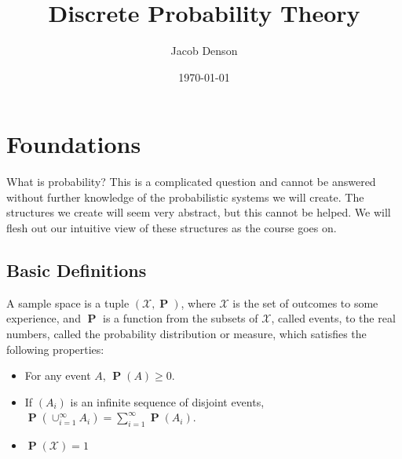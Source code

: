 \documentclass{report}
\title{Discrete Probability Theory}
\author{Jacob Denson}
\date{\today}
\makeatletter
\DeclareMathOperator{\prob}{\mathbf{P}}
\def\printauthor{%
    {\large \@author}}
\newcommand\titlepagedecoration{%
\begin{tikzpicture}[remember picture,overlay,shorten >= -10pt]

\coordinate (aux1) at ([yshift=-15pt]current page.north east);
\coordinate (aux2) at ([yshift=-410pt]current page.north east);
\coordinate (aux3) at ([xshift=-4.5cm]current page.north east);
\coordinate (aux4) at ([yshift=-150pt]current page.north east);

\begin{scope}[titlepagecolor!40,line width=12pt,rounded corners=12pt]
\draw
  (aux1) -- coordinate (a)
  ++(225:5) --
  ++(-45:5.1) coordinate (b);
\draw[shorten <= -10pt]
  (aux3) --
  (a) --
  (aux1);
\draw[opacity=0.6,titlepagecolor,shorten <= -10pt]
  (b) --
  ++(225:2.2) --
  ++(-45:2.2);
\end{scope}
\draw[titlepagecolor,line width=8pt,rounded corners=8pt,shorten <= -10pt]
  (aux4) --
  ++(225:0.8) --
  ++(-45:0.8);
\begin{scope}[titlepagecolor!70,line width=6pt,rounded corners=8pt]
\draw[shorten <= -10pt]
  (aux2) --
  ++(225:3) coordinate[pos=0.45] (c) --
  ++(-45:3.1);
\draw
  (aux2) --
  (c) --
  ++(135:2.5) --
  ++(45:2.5) --
  ++(-45:2.5) coordinate[pos=0.3] (d);   
\draw 
  (d) -- +(45:1);
\end{scope}
\end{tikzpicture}%
}
\makeatother
\begin{document}

\chapter{Foundations}

What is probability? This is a complicated question and cannot be answered without further knowledge of the probabilistic systems we will create. The structures we create will seem very abstract, but this cannot be helped. We will flesh out our intuitive view of these structures as the course goes on.

\section{Basic Definitions}

A sample space is a tuple $(\mathcal{X}, \prob)$, where $\mathcal{X}$ is the set of outcomes to some experience, and $\prob$ is a function from the subsets of $\mathcal{X}$, called events, to the real numbers, called the probability distribution or measure, which satisfies the following properties:
\begin{itemize}
    \item For any event $A$, $\prob(A) \geq 0$.
    \item If $(A_i)$ is an infinite sequence of disjoint events, $\prob(\cup_{i = 1}^\infty A_i) = \sum_{i = 1}^\infty \prob(A_i)$.
    \item $\prob(\mathcal{X}) = 1$
\end{itemize}
\end{document}

